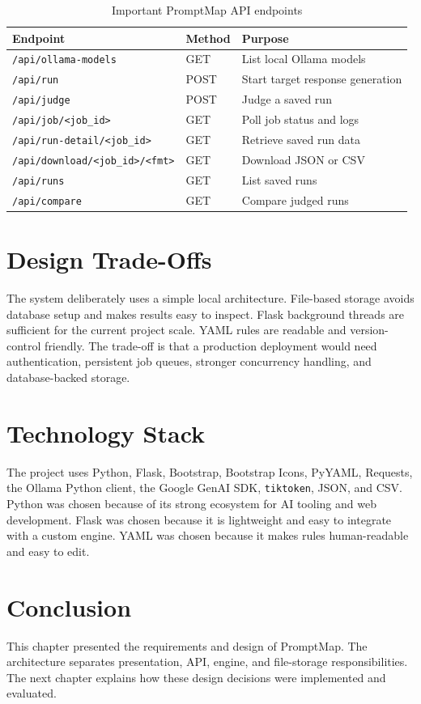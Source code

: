 \begin{table}[h]
\centering
\caption{Important PromptMap API endpoints}
\label{api_table}
\begin{tabular}{lll}
\toprule
Endpoint & Method & Purpose\\
\midrule
\texttt{/api/ollama-models} & GET & List local Ollama models\\
\texttt{/api/run} & POST & Start target response generation\\
\texttt{/api/judge} & POST & Judge a saved run\\
\texttt{/api/job/<job\_id>} & GET & Poll job status and logs\\
\texttt{/api/run-detail/<job\_id>} & GET & Retrieve saved run data\\
\texttt{/api/download/<job\_id>/<fmt>} & GET & Download JSON or CSV\\
\texttt{/api/runs} & GET & List saved runs\\
\texttt{/api/compare} & GET & Compare judged runs\\
\bottomrule
\end{tabular}
\end{table}

\section{Design Trade-Offs}
The system deliberately uses a simple local architecture. File-based storage avoids database setup and makes results easy to inspect. Flask background threads are sufficient for the current project scale. YAML rules are readable and version-control friendly. The trade-off is that a production deployment would need authentication, persistent job queues, stronger concurrency handling, and database-backed storage.

\section{Technology Stack}
The project uses Python, Flask, Bootstrap, Bootstrap Icons, PyYAML, Requests, the Ollama Python client, the Google GenAI SDK, \texttt{tiktoken}, JSON, and CSV. Python was chosen because of its strong ecosystem for AI tooling and web development. Flask was chosen because it is lightweight and easy to integrate with a custom engine. YAML was chosen because it makes rules human-readable and easy to edit.

\section{Conclusion}
This chapter presented the requirements and design of PromptMap. The architecture separates presentation, API, engine, and file-storage responsibilities. The next chapter explains how these design decisions were implemented and evaluated.
